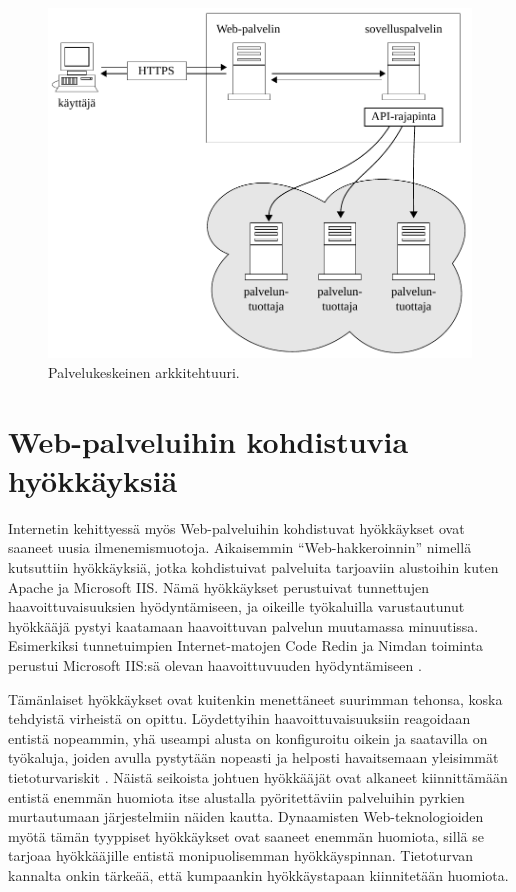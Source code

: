 \begin{figure}[htp]
\centering
\includegraphics[width=12cm]{pics/soa_arkkitehtuuri.pdf}
\caption{Palvelukeskeinen arkkitehtuuri.}
\label{soa}
\end{figure}

\newpage

\section{Web-palveluihin kohdistuvia hyökkäyksiä}

Internetin kehittyessä myös Web-palveluihin kohdistuvat hyökkäykset ovat saaneet
uusia ilmenemismuotoja. Aikaisemmin ``Web-hakkeroinnin'' nimellä kutsuttiin
hyökkäyksiä, jotka kohdistuivat palveluita tarjoaviin alustoihin kuten Apache ja 
Microsoft IIS. Nämä hyökkäykset perustuivat tunnettujen haavoittuvaisuuksien
hyödyntämiseen, ja oikeille työkaluilla varustautunut hyökkääjä pystyi kaatamaan haavoittuvan
palvelun muutamassa minuutissa. Esimerkiksi tunnetuimpien Internet-matojen Code Redin ja Nimdan toiminta
perustui Microsoft IIS:sä olevan haavoittuvuuden hyödyntämiseen \cite{Hacking}. 

Tämänlaiset hyökkäykset ovat kuitenkin menettäneet suurimman tehonsa, koska tehdyistä virheistä on opittu. Löydettyihin 
haavoittuvaisuuksiin reagoidaan entistä nopeammin, yhä useampi alusta on konfiguroitu oikein ja saatavilla on työkaluja, joiden
avulla pystytään nopeasti ja helposti havaitsemaan yleisimmät tietoturvariskit \cite{Hacking}. Näistä seikoista johtuen
hyökkääjät ovat alkaneet kiinnittämään entistä enemmän huomiota itse alustalla pyöritettäviin palveluihin pyrkien 
murtautumaan järjestelmiin näiden kautta. Dynaamisten Web-teknologioiden myötä tämän tyyppiset hyökkäykset ovat saaneet
enemmän huomiota, sillä se tarjoaa hyökkääjille entistä monipuolisemman hyökkäyspinnan. Tietoturvan 
kannalta onkin tärkeää, että kumpaankin hyökkäystapaan kiinnitetään huomiota.

